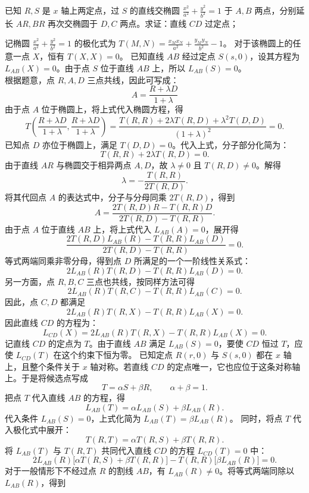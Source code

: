 \begin{exercise}
已知 \(R,S\) 是 \(x\) 轴上两定点，过 \(S\) 的直线交椭圆 \(\frac{x^2}{a^2} + \frac{y^2}{b^2} = 1\) 于 \(A,B\) 两点，分别延长 \(AR,BR\) 再次交椭圆于 \(D,C\) 两点。求证：直线 \(CD\) 过定点；
\end{exercise}
\begin{solution}
记椭圆 $\frac{x^2}{a^2} + \frac{y^2}{b^2} = 1$ 的极化式为 $T(M, N) = \frac{x_M x_N}{a^2} + \frac{y_M y_N}{b^2} - 1$。
对于该椭圆上的任意一点 $X$，恒有 $T(X, X) = 0$。
已知直线 $AB$ 经过定点 $S(s, 0)$，设其方程为 $L_{AB}(X) = 0$。由于点 $S$ 位于直线 $AB$ 上，所以 $L_{AB}(S) = 0$。\\
根据题意，点 $R, A, D$ 三点共线，因此可写成：
\[ A = \frac{R + \lambda D}{1+\lambda} \]
由于点 $A$ 位于椭圆上，将上式代入椭圆方程，得
\[ T\left(\frac{R + \lambda D}{1+\lambda}, \frac{R + \lambda D}{1+\lambda}\right) = \frac{T(R, R) + 2\lambda T(R, D) + \lambda^2 T(D, D)}{(1+\lambda)^2} = 0. \]
已知点 $D$ 亦位于椭圆上，满足 $T(D, D) = 0$。代入上式，分子部分化简为：
\[ T(R, R) + 2\lambda T(R, D) = 0. \]
由于直线 $AR$ 与椭圆交于相异两点 $A, D$，故 $\lambda \neq 0$ 且 $T(R, D) \neq 0$。解得
\[ \lambda = -\frac{T(R, R)}{2T(R, D)}. \]
将其代回点 $A$ 的表达式中，分子与分母同乘 $2T(R, D)$，得到
\[ A = \frac{2T(R, D)R - T(R, R)D}{2T(R, D) - T(R, R)}. \]
由于点 $A$ 位于直线 $AB$ 上，将上式代入 $L_{AB}(A) = 0$，展开得
\[ \frac{2T(R, D)L_{AB}(R) - T(R, R)L_{AB}(D)}{2T(R, D) - T(R, R)} = 0. \]
等式两端同乘非零分母，得到点 $D$ 所满足的一个一阶线性关系式：
\[ 2L_{AB}(R)T(R, D) - T(R, R)L_{AB}(D) = 0. \]
另一方面，点 $R,B,C$ 三点也共线，按同样方法可得
\[ 2L_{AB}(R)T(R, C) - T(R, R)L_{AB}(C) = 0. \]
因此，点 $C,D$ 都满足
\[ 2L_{AB}(R)T(R, X) - T(R, R)L_{AB}(X) = 0. \]
因此直线 $CD$ 的方程为：
\[ L_{CD}(X) = 2L_{AB}(R)T(R, X) - T(R, R)L_{AB}(X) = 0. \]
记直线 $CD$ 的定点为 $T$。由于直线 $AB$ 满足 $L_{AB}(S)=0$，要使 $CD$ 恒过 $T$，应使 $L_{CD}(T)$ 在这个约束下恒为零。
已知定点 $R(r,0)$ 与 $S(s,0)$ 都在 $x$ 轴上，且整个条件关于 $x$ 轴对称。若直线 $CD$ 的定点唯一，它也应位于这条对称轴上。于是将候选点写成
\[ T = \alpha S + \beta R,\qquad \alpha + \beta = 1. \]
把点 $T$ 代入直线 $AB$ 的方程，得
\[ L_{AB}(T) = \alpha L_{AB}(S) + \beta L_{AB}(R). \]
代入条件 $L_{AB}(S) = 0$，上式化简为 $L_{AB}(T) = \beta L_{AB}(R)$。
同时，将点 $T$ 代入极化式中展开：
\[ T(R, T) = \alpha T(R, S) + \beta T(R, R). \]
将 $L_{AB}(T)$ 与 $T(R, T)$ 共同代入直线 $CD$ 的方程 $L_{CD}(T) = 0$ 中：
\[ 2L_{AB}(R)\big[\alpha T(R, S) + \beta T(R, R)\big] - T(R, R)\big[\beta L_{AB}(R)\big] = 0. \]
对于一般情形下不经过点 $R$ 的割线 $AB$，有 $L_{AB}(R) \neq 0$。将等式两端同除以 $L_{AB}(R)$，得到

\end{solution}
